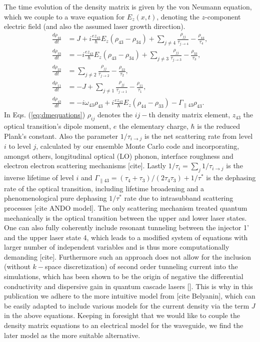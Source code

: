 \documentclass[11pt,final]{scrbook}
\begin{document}
The time evolution of the density matrix is given by the von Neumann equation, which we couple to a wave equation for $E_z(x,t)$, denoting the $z$-component electric field (and also the assumed laser growth direction).  
\begin{subequations}
	\label{eq:dmequations}
 \begin{align}
	\frac{d\rho_{44}}{dt} &= J +i\frac{ez_{43}}{\hbar}E_z(\rho_{43}-\rho_{34}) + \sum_{j\neq 4} \frac{\rho_{jj}}{\tau_{j\rightarrow 4}}  - \frac{\rho_{44}}{\tau_{4}}, \\
	\frac{d\rho_{33}}{dt} &= -i\frac{ez_{43}}{\hbar}E_z(\rho_{43}-\rho_{34}) + \sum_{j\neq 3} \frac{\rho_{jj}}{\tau_{j\rightarrow 3}} - \frac{\rho_{33}}{\tau_{3}}, \\
	\frac{d\rho_{22}}{dt} &= \sum_{j\neq 2} \frac{\rho_{jj}}{\tau_{j\rightarrow 2}} - \frac{\rho_{22}}{\tau_{2}}, \\
	\frac{d\rho_{11}}{dt} &=  -J + \sum_{j\neq 1} \frac{\rho_{jj}}{\tau_{j\rightarrow 1}} - \frac{\rho_{11}}{\tau_{1}}, \\
	\frac{d\rho_{43}}{dt} &= - i\omega_{43}\rho_{43} + i\frac{ez_{43}}{\hbar}E_z(\rho_{44}-\rho_{33})-\Gamma_{\parallel 43}\rho_{43}.
 \end{align}
\end{subequations}
In Eqs. (\ref{eq:dmequations}) $\rho_{ij}$ denotes the $ij-$th density matrix element,  $z_{43}$ the optical transition's dipole moment, $e$ the elementary charge, $\hbar$ is the reduced Plank's constant. Also the parameter $1/\tau_{i\rightarrow j}$ is the net scattering rate from level $i$ to level $j$, calculated by our ensemble Monte Carlo code and incorporating, amongst others, longitudinal optical (LO) phonon, interface roughness and electron electron scattering mechanisms [cite]. Lastly $1/\tau_{i} = \sum_j 1/\tau_{i\rightarrow j}$ is the inverse lifetime of level $i$ and $\Gamma_{\parallel 43} = (\tau_4+\tau_3)/(2\tau_4\tau_3)+1/\tau^*$ is the dephasing rate of the optical transition, including lifetime broadening and a phenomenological pure dephasing $1/\tau^*$ rate due to intrasubband scattering processes [cite ANDO model]. The only scattering mechanism treated quantum mechanically is the optical transition between the upper and lower laser states. One can also fully coherently include resonant tunneling between the injector 1' and the upper laser state 4, which leads to a modified system of equations with larger number of independent variables and is thus more computationally demanding [cite]. Furthermore such an approach does not allow for the inclusion (without $k-$space discretization) of second order tunneling current into the simulations, which has been shown to be the origin of negative the differential conductivity and dispersive gain  in quantum cascade lasers []. This is why in this publication we adhere to the more intuitive model from [cite Belyanin], which can be easily adapted to include various models for the current density via the term $J$ in the above equations. Keeping in foresight that we would like to couple the density matrix equations to an electrical model for the waveguide, we find the later model as the more suitable alternative.
\end{document}
